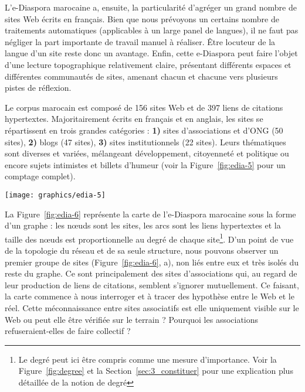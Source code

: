 \documentclass[symmetric,justified,marginals=raggedouter]{tufte-book}
\begin{document}
L'e-Diaspora marocaine a, ensuite, la particularité d'agréger un grand nombre de sites Web écrits en français. Bien que nous prévoyons un certains nombre de traitements automatiques (applicables à un large panel de langues), il ne faut pas négliger la part importante de travail manuel à réaliser. Être locuteur de la langue d'un site reste donc un avantage. Enfin, cette e-Diaspora peut faire l'objet d'une lecture topographique relativement claire, présentant différents espaces et différentes communautés de sites, amenant chacun et chacune vers plusieurs pistes de réflexion. 

Le corpus marocain est composé de 156 sites Web et de 397 liens de citations hypertextes. Majoritairement écrits en français et en anglais, les sites se répartissent en trois grandes catégories : \textbf{1)} sites d'associa\-tions et d'ONG (50 sites), \textbf{2)} blogs (47 sites), \textbf{3)} sites institutionnels (22 sites). Leurs thématiques sont diverses et variées, mélangeant développement, citoyenneté et politique ou encore sujets intimistes et billets d'hum\-eur (voir la Figure~\ref{fig:edia-5} pour un comptage complet).

\begin{figure*}
  \texttt{[image: graphics/edia-5]}
  \caption{Répartition des sites de l'e-Diaspora marocaine par catégorie, sous-catégorie et langue principale (source : Atlas e-Diaspora \url{https://frama.link/Pyt3Aq2x})}
  \label{fig:edia-5}
\end{figure*} 

\noindent La Figure~\ref{fig:edia-6} représente la carte de l'e-Diaspora marocaine sous la forme d'un graphe : les nœuds sont les sites, les arcs sont les liens hypertextes et la taille des nœuds est proportionnelle au degré de chaque site\footnote{\RaggedOuter Le degré peut ici être compris comme une mesure d'importance. Voir la Figure~\ref{fig:degree} et la Section~\ref{sec:3_constituer} pour une explication plus détaillée de la notion de degré}. D'un point de vue de la topologie du réseau et de sa seule structure, nous pouvons observer un premier groupe de sites (Figure~\ref{fig:edia-6}, a), non liés entre eux et très isolés du reste du graphe. Ce sont principalement des sites d'associations qui, au regard de leur production de liens de citations, semblent s'ignorer mutuellement. Ce faisant, la carte commence à nous interroger et à tracer des hypothèse entre le Web et le réel. Cette méconnaissance entre sites associatifs est elle uniquement visible sur le Web ou peut elle être vérifiée sur le terrain ? Pourquoi les associations refuseraient-elles de faire collectif ? 
\end{document}
